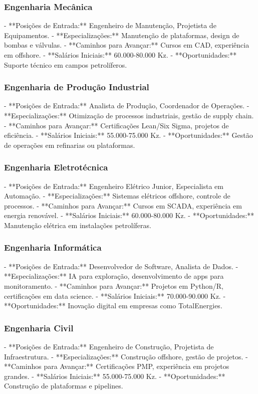 \documentclass[12pt]{article}
\begin{document}
\subsubsection{Engenharia Mecânica}
- **Posições de Entrada:** Engenheiro de Manutenção, Projetista de Equipamentos.
- **Especializações:** Manutenção de plataformas, design de bombas e válvulas.
- **Caminhos para Avançar:** Cursos em CAD, experiência em offshore.
- **Salários Iniciais:** 60.000-80.000 Kz.
- **Oportunidades:** Suporte técnico em campos petrolíferos.

\subsubsection{Engenharia de Produção Industrial}
- **Posições de Entrada:** Analista de Produção, Coordenador de Operações.
- **Especializações:** Otimização de processos industriais, gestão de supply chain.
- **Caminhos para Avançar:** Certificações Lean/Six Sigma, projetos de eficiência.
- **Salários Iniciais:** 55.000-75.000 Kz.
- **Oportunidades:** Gestão de operações em refinarias ou plataformas.

\subsubsection{Engenharia Eletrotécnica}
- **Posições de Entrada:** Engenheiro Elétrico Junior, Especialista em Automação.
- **Especializações:** Sistemas elétricos offshore, controle de processos.
- **Caminhos para Avançar:** Cursos em SCADA, experiência em energia renovável.
- **Salários Iniciais:** 60.000-80.000 Kz.
- **Oportunidades:** Manutenção elétrica em instalações petrolíferas.

\subsubsection{Engenharia Informática}
- **Posições de Entrada:** Desenvolvedor de Software, Analista de Dados.
- **Especializações:** IA para exploração, desenvolvimento de apps para monitoramento.
- **Caminhos para Avançar:** Projetos em Python/R, certificações em data science.
- **Salários Iniciais:** 70.000-90.000 Kz.
- **Oportunidades:** Inovação digital em empresas como TotalEnergies.

\subsubsection{Engenharia Civil}
- **Posições de Entrada:** Engenheiro de Construção, Projetista de Infraestrutura.
- **Especializações:** Construção offshore, gestão de projetos.
- **Caminhos para Avançar:** Certificações PMP, experiência em projetos grandes.
- **Salários Iniciais:** 55.000-75.000 Kz.
- **Oportunidades:** Construção de plataformas e pipelines.
\end{document}
